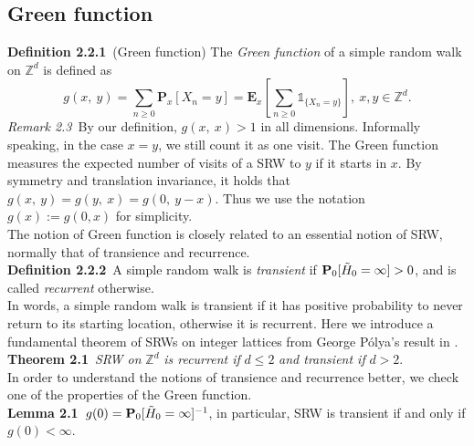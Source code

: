 \documentclass[
11pt, %
a4paper, %
oneside, %
headinclude,footinclude, %
BCOR5mm, %
]{scrartcl}
\begin{document}
\subsection{Green function}
\textbf{Definition 2.2.1}\ (Green function) The \textit{Green function} of a simple random walk on $\mathbb{Z}^d$ is defined as
\begin{equation}
    g(x,\ y)=\sum_{n \geq 0}\mathbf{P}_x[X_n=y]=\mathbf{E}_x\left[\sum_{n \geq 0} \mathbb{1}_{\{X_n=y\}}\right], \ x, y \in \mathbb{Z}^d.\tag{2.6}
\end{equation}
\textit{Remark 2.3}\ By our definition, $g(x,\ x)>1$ in all dimensions. Informally speaking, in the case $x=y$, we still count it as one visit.
The Green function measures the expected number of visits of a SRW to $y$ if it starts in $x$. By symmetry and translation invariance, it holds that $g(x,\ y)=g(y, \ x)=g(0,\ y-x)$. Thus we use the notation $g(x):=g(0,x)$ for simplicity. 
\vspace{0.6em}\\The notion of Green function is closely related to an essential notion of SRW, normally that of transience and recurrence.
\vspace{0.6em}\\\textbf{Definition 2.2.2}\ A simple random walk is \textit{transient} if $\mathbf{P}_0[\Tilde{H}_0=\infty]>0$, and is called \textit{recurrent} otherwise. 
\vspace{0.6em}\\In words, a simple random walk is transient if it has positive probability to never return to its starting location, otherwise it is recurrent. Here we introduce a fundamental theorem of SRWs on integer lattices from George Pólya's result in \cite{polya1921aufgabe}.
\vspace{0.6em}\\\textbf{Theorem 2.1}\ \textit{SRW on} $\mathbb{Z}^d$ \textit{is recurrent if} $d \leq 2$ \textit{and transient if} $d>2$.
\vspace{0.6em}\\In order to understand the notions of transience and recurrence better, we check one of the properties of the Green function. 
\vspace{0.6em}\\\textbf{Lemma 2.1}\ $g(0)=\mathbf{P}_0[\Tilde{H}_0=\infty]^{-1}$, in particular, SRW is transient if and only if $g(0)<\infty$.
\end{document}
